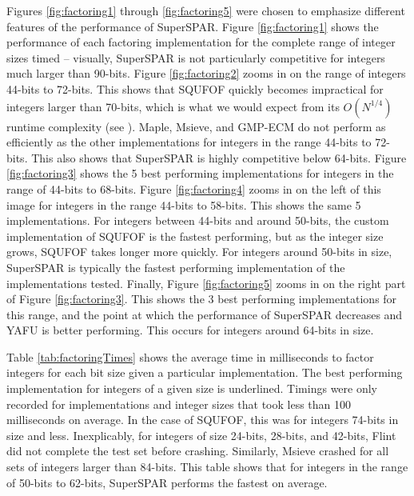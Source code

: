 \documentclass{ucalgthes1}
\theoremstyle{definition}
\begin{document}
Figures \ref{fig:factoring1} through \ref{fig:factoring5} were chosen to emphasize different features of the performance of SuperSPAR.  Figure \ref{fig:factoring1} shows the performance of each factoring implementation for the complete range of integer sizes timed -- visually, SuperSPAR is not particularly competitive for integers much larger than 90-bits.  Figure \ref{fig:factoring2} zooms in on the range of integers \mbox{44-bits} to 72-bits.  This shows that SQUFOF quickly becomes impractical for integers larger than 70-bits, which is what we would expect from its $O(N^{1/4})$ runtime complexity (see \cite[Theorem 4.22]{Gower2008}).  Maple, Msieve, and GMP-ECM do not perform as efficiently as the other implementations for integers in the range 44-bits to 72-bits.  This also shows that SuperSPAR is highly competitive below 64-bits.  Figure \ref{fig:factoring3} shows the 5 best performing implementations for integers in the range of 44-bits to 68-bits.  Figure \ref{fig:factoring4} zooms in on the left of this image for integers in the range 44-bits to 58-bits.  This shows the same 5 implementations.  For integers between 44-bits and around 50-bits, the custom implementation of SQUFOF is the fastest performing, but as the integer size grows, SQUFOF takes longer more quickly.  For integers around 50-bits in size, SuperSPAR is typically the fastest performing implementation of the implementations tested.   Finally, Figure \ref{fig:factoring5} zooms in on the right part of Figure \ref{fig:factoring3}.  This shows the 3 best performing implementations for this range, and the point at which the performance of SuperSPAR decreases and YAFU is better performing.  This occurs for integers around 64-bits in size.

Table \ref{tab:factoringTimes} shows the average time in milliseconds to factor integers for each bit size given a particular implementation.  The best performing implementation for integers of a given size is underlined.  Timings were only recorded for implementations and integer sizes that took less than 100 milliseconds on average.  In the case of SQUFOF, this was for integers 74-bits in size and less.  Inexplicably, for integers of size 24-bits, 28-bits, and 42-bits, Flint did not complete the test set before crashing.  Similarly, Msieve crashed for all sets of integers larger than 84-bits.  This table shows that for integers in the range of 50-bits to 62-bits, SuperSPAR performs the fastest on average.  
\end{document}
